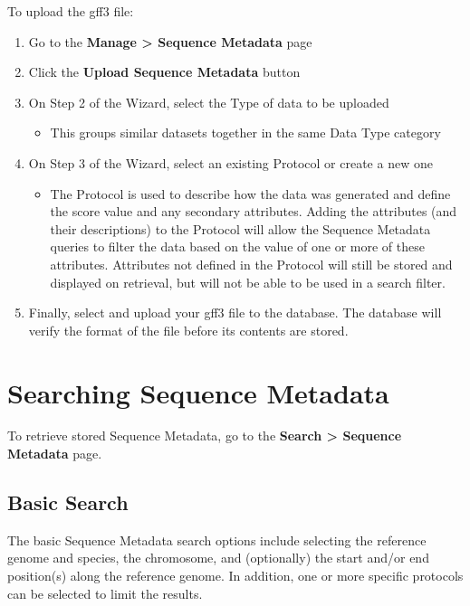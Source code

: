 \documentclass[
  12pt,
]{book}
\providecommand{\tightlist}{%
  \setlength{\itemsep}{0pt}\setlength{\parskip}{0pt}}
\begin{document}
To upload the gff3 file:

\begin{enumerate}
\def\labelenumi{\arabic{enumi}.}
\tightlist
\item
  Go to the \textbf{Manage \textgreater{} Sequence Metadata} page
\item
  Click the \textbf{Upload Sequence Metadata} button
\item
  On Step 2 of the Wizard, select the Type of data to be uploaded

  \begin{itemize}
  \tightlist
  \item
    This groups similar datasets together in the same Data Type category
  \end{itemize}
\item
  On Step 3 of the Wizard, select an existing Protocol or create a new one

  \begin{itemize}
  \tightlist
  \item
    The Protocol is used to describe how the data was generated and define the score value and any secondary attributes. Adding the attributes (and their descriptions) to the Protocol will allow the Sequence Metadata queries to filter the data based on the value of one or more of these attributes. Attributes not defined in the Protocol will still be stored and displayed on retrieval, but will not be able to be used in a search filter.
  \end{itemize}
\item
  Finally, select and upload your gff3 file to the database. The database will verify the format of the file before its contents are stored.
\end{enumerate}

\hypertarget{searching-sequence-metadata}{%
\section{Searching Sequence Metadata}\label{searching-sequence-metadata}}

To retrieve stored Sequence Metadata, go to the \textbf{Search \textgreater{} Sequence Metadata} page.

\hypertarget{basic-search}{%
\subsection{Basic Search}\label{basic-search}}

The basic Sequence Metadata search options include selecting the reference genome and species, the chromosome, and (optionally) the start and/or end position(s) along the reference genome. In addition, one or more specific protocols can be selected to limit the results.
\end{document}
